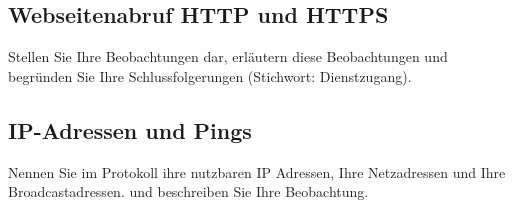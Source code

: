 \documentclass[paper=a4, fontsize=11pt]{scrreprt}
\numberwithin{equation}{section}
\numberwithin{figure}{section}
\numberwithin{table}{section}
\begin{document}
\subsection{Webseitenabruf HTTP und HTTPS}

Stellen Sie Ihre Beobachtungen dar, erläutern diese Beobachtungen und begründen Sie Ihre Schlussfolgerungen
(Stichwort: Dienstzugang).

\subsection{IP-Adressen und Pings}

Nennen Sie im Protokoll ihre nutzbaren IP Adressen, Ihre Netzadressen und Ihre Broadcastadressen. und
beschreiben Sie Ihre Beobachtung.
\end{document}
